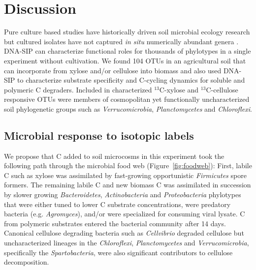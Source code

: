 \section{Discussion} 
Pure culture based studies have historically driven soil microbial ecology
research but cultured isolates have not captured \textit{in situ} numerically
abundant genera \citep{Janssen2006}. DNA-SIP can
characterize functional roles for thousands of phylotypes in a single
experiment without cultivation. We found 104 OTUs in an agricultural soil that
can incorporate from xylose and/or cellulose into biomass and also used DNA-SIP
to characterize substrate specificity and C-cycling dynamics for soluble and
polymeric C degraders. Included in characterized $^{13}$C-xylose and
$^{13}$C-cellulose responsive OTUs were members of cosmopolitan yet
functionally uncharacterized soil phylogenetic groups such as
\textit{Verrucomicrobia}, \textit{Planctomycetes} and \textit{Chloroflexi}.

\subsection{Microbial response to isotopic labels}
We propose that C added to soil microcosms in this experiment took the
following path through the microbial food web (Figure~\ref{fig:foodweb}):
First, labile C such as xylose was assimilated by fast-growing opportunistic
\textit{Firmicutes} spore formers. The remaining labile C and new biomass C was
assimilated in succession by slower growing \textit{Bacteroidetes},
\textit{Actinobacteria} and \textit{Proteobacteria} phylotypes that were either
tuned to lower C substrate concentrations, were predatory bacteria (e.g.
\textit{Agromyces}), and/or were specialized for consuming viral lysate. C from
polymeric substrates entered the bacterial community after 14 days. Canonical
cellulose degrading bacteria such as \textit{Cellvibrio} degraded cellulose
but uncharacterized lineages in the \textit{Chloroflexi},
\textit{Planctomycetes} and \textit{Verrucomicrobia}, specifically the
\textit{Spartobacteria}, were also significant contributors to cellulose
decomposition. 

